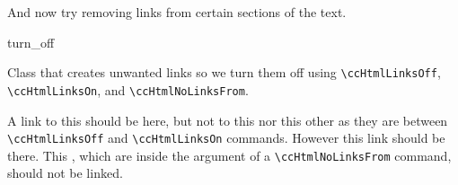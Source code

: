 And now try removing links from certain sections of the text.

\begin{ccClass}{turn_off}

\ccDefinition

Class that creates unwanted links so we turn them off
using \verb+\ccHtmlLinksOff+, \verb+\ccHtmlLinksOn+, and
\verb+\ccHtmlNoLinksFrom+.

A link to this  should be here, but \ccHtmlLinksOff not
to this  nor this other \ccHtmlLinksOn as they
are between \verb+\ccHtmlLinksOff+ and \verb+\ccHtmlLinksOn+ commands.
However this  link should be there.  This
, which
are inside the argument of a \verb+\ccHtmlNoLinksFrom+ command, should
not be linked.

\end{ccClass}


\ccHtmlLinksOff
{}
\ccHtmlLinksOn




